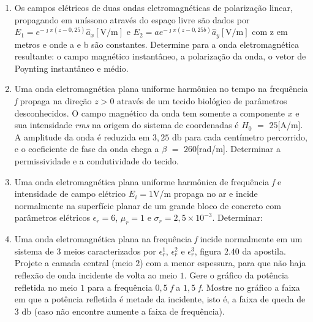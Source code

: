 \begin{enumerate}[1.]

\item Os campos elétricos de duas ondas eletromagnéticas de polarização linear, propagando em uníssono através do espaço livre são dados por $E_{1} = e^{-\jmath \pi (z - 0,25)} \hat{a}_{x} [\si{\volt/\meter}]$ e $E_{2} = ae^{-\jmath \pi (z - 0,25b)} \hat{a}_{y} [\si{\volt/\meter}]$ com z em metros e onde a e b são constantes. Determine para a onda eletromagnética resultante: o campo magnético instantâneo, a polarização da onda, o vetor de Poynting instantâneo e médio.  

\item Uma onda eletromagnética plana uniforme harmônica no tempo na frequência \emph{f} propaga na direção $z > 0$ através de um tecido biológico de parâmetros desconhecidos. O campo magnético da onda tem somente a componente $x$ e sua intensidade \emph{rms} na origem do sistema de coordenadas é $H_{0}$ $=$ $25$\si{\milli}[\si{\ampere/\meter}]. A amplitude da onda é reduzida em $3,25$ \si{\decibel} para cada centímetro percorrido, e o coeficiente de fase da onda chega a $\beta$ $=$ $260$[\si{\radian/\meter}]. Determinar a permissividade e a condutividade do tecido.

\item Uma onda eletromagnética plana uniforme harmônica de frequência \emph{f} e intensidade de campo elétrico $E_{i} = 1$\si{\volt/\meter} propaga no ar e incide normalmente na superfície planar de um grande bloco de concreto com parâmetros elétricos $\epsilon_{r} = 6$, $\mu_{r} = 1$ e $\sigma_{r} = 2,5 \times 10^{-3}$. Determinar:


\item Uma onda eletromagnética plana na frequência \emph{f} incide normalmente em um sistema de $3$ meios caracterizados por $\epsilon^{1}_{r}$,  $\epsilon^{2}_{r}$ e $\epsilon^{3}_{r}$, figura $2.40$ da apostila. Projete a camada central (meio $2$) com a menor espessura, para que não haja reflexão de onda incidente de volta ao meio $1$. Gere o gráfico da potência refletida no meio $1$ para a frequência $0,5$ \emph{f} a $1,5$ \emph{f}. Mostre no gráfico a faixa em que a potência refletida é metade da incidente, isto é, a faixa de queda de $3$ \si{\decibel} (caso não encontre aumente a faixa de frequência).


\end{enumerate}
